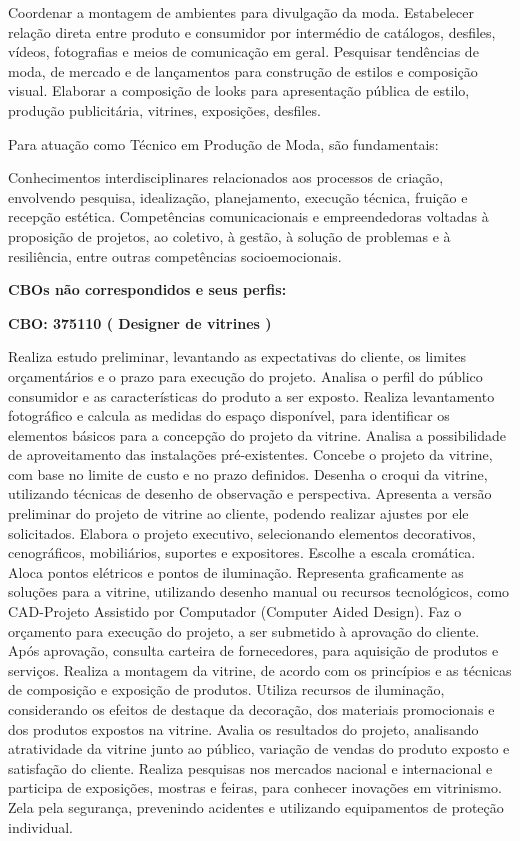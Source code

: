 \documentclass[
]{article}
\begin{document}
Coordenar a montagem de ambientes para divulgação da moda. Estabelecer
relação direta entre produto e consumidor por intermédio de catálogos,
desfiles, vídeos, fotografias e meios de comunicação em geral. Pesquisar
tendências de moda, de mercado e de lançamentos para construção de
estilos e composição visual. Elaborar a composição de looks para
apresentação pública de estilo, produção publicitária, vitrines,
exposições, desfiles.

Para atuação como Técnico em Produção de Moda, são fundamentais:

Conhecimentos interdisciplinares relacionados aos processos de criação,
envolvendo pesquisa, idealização, planejamento, execução técnica,
fruição e recepção estética. Competências comunicacionais e
empreendedoras voltadas à proposição de projetos, ao coletivo, à gestão,
à solução de problemas e à resiliência, entre outras competências
socioemocionais.

\textbf{CBOs não correspondidos e seus perfis:}

\textbf{CBO: 375110  ( Designer de vitrines )}

Realiza estudo preliminar, levantando as expectativas do cliente, os
limites orçamentários e o prazo para execução do projeto. Analisa o
perfil do público consumidor e as características do produto a ser
exposto. Realiza levantamento fotográfico e calcula as medidas do espaço
disponível, para identificar os elementos básicos para a concepção do
projeto da vitrine. Analisa a possibilidade de aproveitamento das
instalações pré-existentes. Concebe o projeto da vitrine, com base no
limite de custo e no prazo definidos. Desenha o croqui da vitrine,
utilizando técnicas de desenho de observação e perspectiva. Apresenta a
versão preliminar do projeto de vitrine ao cliente, podendo realizar
ajustes por ele solicitados. Elabora o projeto executivo, selecionando
elementos decorativos, cenográficos, mobiliários, suportes e
expositores. Escolhe a escala cromática. Aloca pontos elétricos e pontos
de iluminação. Representa graficamente as soluções para a vitrine,
utilizando desenho manual ou recursos tecnológicos, como CAD-Projeto
Assistido por Computador (Computer Aided Design). Faz o orçamento para
execução do projeto, a ser submetido à aprovação do cliente. Após
aprovação, consulta carteira de fornecedores, para aquisição de produtos
e serviços. Realiza a montagem da vitrine, de acordo com os princípios e
as técnicas de composição e exposição de produtos. Utiliza recursos de
iluminação, considerando os efeitos de destaque da decoração, dos
materiais promocionais e dos produtos expostos na vitrine. Avalia os
resultados do projeto, analisando atratividade da vitrine junto ao
público, variação de vendas do produto exposto e satisfação do cliente.
Realiza pesquisas nos mercados nacional e internacional e participa de
exposições, mostras e feiras, para conhecer inovações em vitrinismo.
Zela pela segurança, prevenindo acidentes e utilizando equipamentos de
proteção individual.
\end{document}
